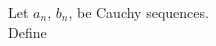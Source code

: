 \documentclass[preview]{standalone}
\begin{document}
\begin{center}
Let $a_n$, $b_n$, be Cauchy sequences.\\Define
\end{center}
\end{document}
